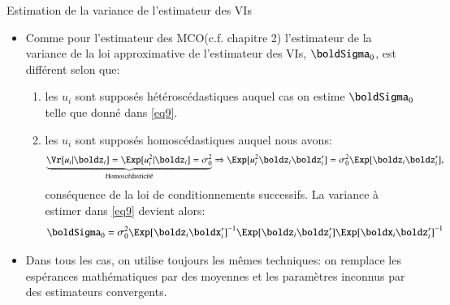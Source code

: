 \begin{frame}[allowframebreaks]{Estimation de la variance de l'estimateur des VIs}
\begin{itemize}
    \item Comme pour l'estimateur des MCO(c.f. chapitre 2) l'estimateur 
    de la variance de la loi approximative de l'estimateur des VIs, 
    $\boldSigma_0$, est différent selon que:
    \begin{enumerate}[$\star$]
    \item les $u_i$ sont supposés hétéroscédastiques auquel cas on estime 
    $\boldSigma_0$ telle que donné dans \eqref{eq9}. 
    \item les $u_i$ sont supposés homoscédastiques auquel nous avons:
    \begin{align*}
       \underbrace{\Vr[u_i|\boldz_i] = \Exp[u_i^2|\boldz_i]=\sigma_0^2}_{\text{Homoscédasticité}}
&\Rightarrow \Exp[u_i^2\boldz_i \boldz_i^\prime] = \sigma_0^2\Exp[\boldz_i\boldz_i^\prime],
    \end{align*}
    conséquence de la loi de conditionnements successifs. La variance à estimer dans \eqref{eq9} 
    devient alors: 
    \begin{align}
        \boldSigma_0 &= 
         \sigma_0^2 \Exp[\boldz_i\boldx_i^\prime]^{-1} 
         \Exp[\boldz_i\boldz_i^\prime] \Exp[\boldx_i\boldz_i^\prime]^{-1}
         \label{eq10}
    \end{align}
    \end{enumerate}
    \item Dans tous les cas, on utilise toujours les mêmes techniques:
    on remplace les espérances mathématiques par des moyennes et les 
    paramètres inconnus par des estimateurs convergents.

    \framebreak


\end{itemize}
\end{frame}
